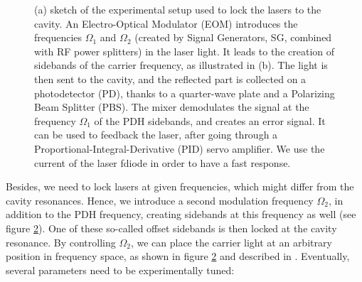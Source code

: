 \documentclass[11pt]{article}
\numberwithin{equation}{section}
\numberwithin{figure}{section}
\begin{document}
%
\begin{figure}[htbp]
	\centering
	\begin{subfigure}[b]{0.54\textwidth}
		\centering
		\def\svgwidth{0.99\linewidth}
		\hspace{-0.5cm}
		\small
   		
   		\vspace{0.7cm}
		\caption{\small }
		\label{fig:cavity_lock}
	\end{subfigure}
	\begin{subfigure}[b]{0.45\textwidth}
    	\centering
    	\def\svgwidth{0.99\linewidth}
    	\small
    			
		\caption{\small }
		\label{fig:offset_lock}
	\end{subfigure}	
	\caption{\small (a) sketch of the experimental setup used to lock the lasers to the cavity. An Electro-Optical Modulator (EOM) introduces the frequencies $\Omega_1$ and $\Omega_2$ (created by Signal Generators, SG, combined with RF power splitters) in the laser light. It leads to the creation of sidebands of the carrier frequency, as illustrated in (b).  The light is then sent to the cavity, and the reflected part is collected on a photodetector (PD), thanks to a quarter-wave plate and a Polarizing Beam Splitter (PBS). The mixer demodulates the signal at the frequency $\Omega_1$ of the PDH sidebands, and creates an error signal. It can be used to feedback the laser, after going through a Proportional-Integral-Derivative (PID) servo amplifier. We use the current of the laser fdiode in order to have a fast response.}
    \label{fig:lock}
\end{figure}
%
Besides, we need to lock lasers at given frequencies, which might differ from the cavity resonances. Hence, we introduce a second modulation frequency $\Omega_2$, in addition to the PDH frequency, creating sidebands at this frequency as well (see figure \ref{fig:offset_lock}). One of these so-called offset sidebands is then locked at the cavity resonance. By controlling $\Omega_2$, we can place the carrier light at an arbitrary position in frequency space, as shown in figure \ref{fig:offset_lock} and described in \cite{2008_thorpe}.
Eventually, several parameters need to be experimentally tuned:
\end{document}
